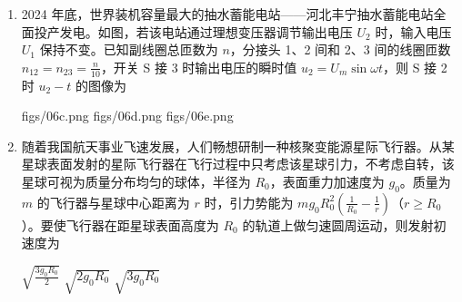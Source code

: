 \documentclass[\gkver]{gaokaozhenti}
\begin{document}
\begin{enumerate}
{故选 C。
}

\item
2024 年底，世界装机容量最大的抽水蓄能电站——河北丰宁抽水蓄能电站全面投产发电。如图，若该电站通过理想变压器调节输出电压 $U_{2}$ 时，输入电压 $U_{1}$ 保持不变。已知副线圈总匝数为 $n$，分接头 1、2 间和 2、3 间的线圈匝数 $n_{12} = n_{23} = \frac{n}{10}$，开关 S 接 3 时输出电压的瞬时值 $u_{2} = U_{m}\sin\omega t$，则 S 接 2 时 $u_{2}-t$ 的图像为


{figs/06c.png}
{figs/06d.png}
{figs/06e.png}


\item
随着我国航天事业飞速发展，人们畅想研制一种核聚变能源星际飞行器。从某星球表面发射的星际飞行器在飞行过程中只考虑该星球引力，不考虑自转，该星球可视为质量分布均匀的球体，半径为 $R_{0}$，表面重力加速度为 $g_{0}$。质量为 $m$ 的飞行器与星球中心距离为 $r$ 时，引力势能为 $mg_{0}R_{0}^{2}\left( {\frac{1}{R_{0}} - \frac{1}{r}} \right)$（$r \geq R_{0}$）。要使飞行器在距星球表面高度为 $R_{0}$ 的轨道上做匀速圆周运动，则发射初速度为

{$\sqrt{\frac{3g_{0}R_{0}}{2}}$}
{$\sqrt{2g_{0}R_{0}}$}
{$\sqrt{3g_{0}R_{0}}$}

\end{enumerate}
\end{document}
